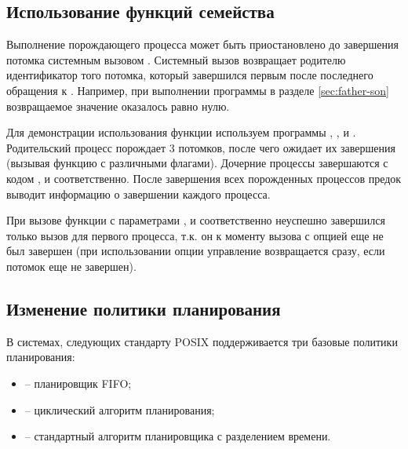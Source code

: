 \subsection{Использование функций семейства }

Выполнение порождающего процесса может быть приостановлено до завершения потомка системным вызовом . Системный вызов  возвращает родителю идентификатор того потомка, который завершился первым после последнего обращения к . Например, при выполнении программы в разделе \ref{sec:father-son} возвращаемое значение оказалось равно нулю. 

Для демонстрации использования функции  используем программы , ,  и . Родительский процесс порождает 3 потомков, после чего ожидает их завершения (вызывая функцию  с различными флагами). Дочерние процессы завершаются с кодом ,  и  соответственно. После завершения всех порожденных процессов предок выводит информацию о завершении каждого процесса.









При вызове функции  с параметрами ,  и  соответственно неуспешно завершился только вызов  для первого процесса, т.к. он к моменту вызова  с опцией  еще не был завершен (при использовании опции  управление возвращается сразу, если потомок еще не завершен).


 
\subsection{Изменение политики планирования}

В системах, следующих стандарту POSIX поддерживается три базовые политики планирования:
\begin{itemize}
	\item {} -- планировщик FIFO;
	\item {} -- циклический алгоритм планирования;
	\item {} -- стандартный алгоритм планировщика с	разделением времени.
\end{itemize}

